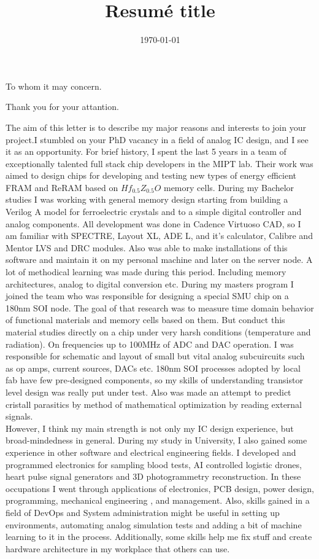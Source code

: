 \documentclass[12pt,a4paper,roman]{moderncv}        %
\title{Resumé title}                               %
\begin{document}
\date{\today}
\opening{To whom it may concern.}
\closing{Thank you for your attantion.}
\makelettertitle

\hspace{1cm}The aim of this letter is to describe my major reasons and interests to join your project.I stumbled on your PhD vacancy  in a field of analog IC design, and I see it as an opportunity.
For brief history, I spent the last 5 years in a team of exceptionally talented full stack chip developers in the MIPT lab. Their work was aimed to design chips for developing and testing new types of energy efficient FRAM and ReRAM based on $Hf_{0.5} Z_{0.5} O $ memory cells. During my Bachelor studies I was working with general memory design starting from building a Verilog A model for ferroelectric crystals and to a simple digital controller and analog components. All development was done in Cadence Virtuoso CAD, so I am familiar with SPECTRE, Layout XL, ADE L, and it’s calculator, Calibre and Mentor LVS and DRC modules. Also was able to make installations of this software and maintain it on my personal machine and later on the server node. A lot of methodical learning was made during this period. Including memory architectures, analog to digital conversion etc. 
During my masters program I joined the team who was responsible for designing a special SMU chip on a 180nm SOI node. The goal of that research was to measure time domain behavior  of functional materials and memory cells based on them. But conduct this material studies directly on a chip under very harsh conditions (temperature and radiation). On  frequencies  up to 100MHz of ADC and DAC operation. I was responsible for schematic and layout of  small but vital analog subcuircuits such as op amps, current sources, DACs etc. 180nm SOI  processes adopted by local fab have few pre-designed components, so my skills of understanding transistor level design was really put under test. Also was made an attempt to predict cristall parasitics by method of mathematical optimization by reading external signals.
\\
\hspace{1cm} However, I think my main strength is not only my IC design experience, but broad-mindedness in general. During my study in University, I also gained some experience in other software and electrical engineering fields. I developed and programmed electronics for sampling blood tests, AI controlled logistic drones, heart pulse signal generators and 3D photogrammetry reconstruction. In these occupations  I went through applications of electronics, PCB design, power design, programming, mechanical engineering , and management. Also, skills gained in a field of DevOps and System administration might be useful in setting up environments, automating analog simulation tests and adding a bit of machine learning to it in the process. Additionally, some skills help me fix stuff and create hardware architecture in my workplace that others can use.
\end{document}
